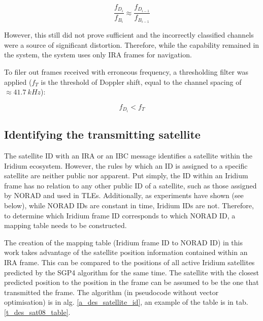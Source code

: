 \begin{equation*}
    \frac{f_{D_i}}{f_{B_i}} \approx \frac{f_{D_{i-1}}}{f_{B_{i-1}}} 
\end{equation*}

However, this still did not prove sufficient and the incorrectly classified channels were a source of significant distortion. Therefore, while the capability remained in the system, the system uses only IRA frames for navigation.

To filer out frames received with erroneous frequency, a thresholding filter was applied ($f_T$ is the threshold of Doppler shift, equal to the channel spacing of $\approx\qty{41.7}{kHz}$):

\begin{equation*}
    f_{D_i} < f_T
\end{equation*}

\subsection{Identifying the transmitting satellite}
The satellite ID with an IRA or an IBC message identifies a satellite within the Iridium ecosystem. However, the rules by which an ID is assigned to a specific satellite are neither public nor apparent. Put simply, the ID within an Iridium frame has no relation to any other public ID of a satellite, such as those assigned by NORAD and used in TLEs. Additionally, as experiments have shown (see below), while NORAD IDs are constant in time, Iridium IDs are not. Therefore, to determine which Iridium frame ID corresponds to which NORAD ID, a mapping table needs to be constructed.

The creation of the mapping table (Iridium frame ID to NORAD ID) in this work takes advantage of the satellite position information contained within an IRA frame. This can be compared to the positions of all active Iridium satellites predicted by the SGP4 algorithm for the same time. The satellite with the closest predicted position to the position in the frame can be assumed to be the one that transmitted the frame. The algorithm (in pseudocode without vector optimisation) is in alg. \ref{a_des_satellite_id}, an example of the table is in tab. \ref{t_des_sat08_table}.

